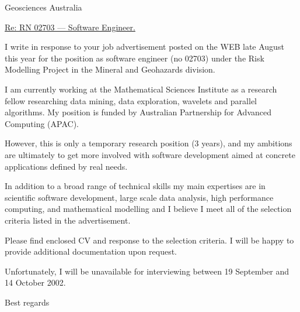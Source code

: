 \documentclass[12pt]{letter}
\begin{document}
\address{       Dr.\ Ole M{\o}ller Nielsen     \\
                Computer Sciences Laboratory, RSISE   \\
                Australian National University \\
                Canberra, ACT 0200     \\
                Ph: +61 2 6279 8627 \\
                email: Ole.Nielsen@anu.edu.au}


\signature{Ole M{\o}ller Nielsen}

\begin{letter}
{Geosciences Australia} 
 
\opening{\underline{Re: RN 02703 --- Software Engineer.}}

I write in response to your job advertisement posted on the WEB 
late August this year for the position as software engineer (no 02703)
under the Risk Modelling Project in the Mineral and Geohazards division.

I am currently working at the Mathematical Sciences Institute as
a research fellow researching data mining, 
data exploration, wavelets and parallel algorithms.
My position is funded by Australian Partnership for Advanced Computing 
(APAC).

However, this is only a temporary research position (3 years),
and my ambitions are ultimately to get more involved with software development
aimed at concrete applications defined by real needs.

In addition to a broad range of technical skills 
my main expertises are in scientific software development,
large scale data analysis, high performance computing, 
and mathematical modelling and I believe I meet all of the selection criteria 
listed in the advertisement.

Please find enclosed CV and response to the selection criteria.
I will be happy to provide additional documentation upon request.

Unfortunately, 
I will be unavailable for interviewing between 
19 September and 14 October 2002.

\vspace{1cm}
\closing{Best regards}

\end{letter}
\end{document}
